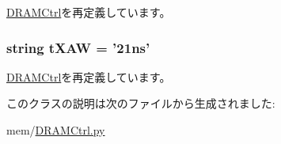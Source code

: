 \hyperlink{classDRAMCtrl_1_1DRAMCtrl_aab12a5441587fc9009b2cd7b83865f92}{DRAMCtrl}を再定義しています。\hypertarget{classDRAMCtrl_1_1DDR4__2400__x64_a94c112e585153e09e803751da3cfafcd}{
\subsubsection[{tXAW}]{\setlength{\rightskip}{0pt plus 5cm}string {\bf tXAW} = '21ns'}}
\label{classDRAMCtrl_1_1DDR4__2400__x64_a94c112e585153e09e803751da3cfafcd}


\hyperlink{classDRAMCtrl_1_1DRAMCtrl_a7de8ac1f9497dea29b2aaab67a0fb1cc}{DRAMCtrl}を再定義しています。

このクラスの説明は次のファイルから生成されました:\begin{DoxyCompactItemize}
\item 
mem/\hyperlink{DRAMCtrl_8py}{DRAMCtrl.py}\end{DoxyCompactItemize}

